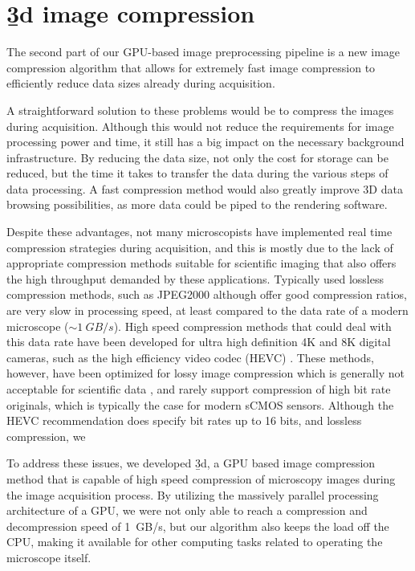 \section{\b3d image compression}

  The second part of our GPU-based image preprocessing pipeline is a new image compression algorithm that allows for extremely fast image compression to efficiently reduce data sizes already during acquisition.
  
  

  A straightforward solution to these problems would be to compress the images during acquisition. Although this would not reduce the requirements for image processing power and time, it still has a big impact on the necessary background infrastructure. By reducing the data size, not only the cost for storage can be reduced, but the time it takes to transfer the data during the various steps of data processing. A fast compression method would also greatly improve 3D data browsing possibilities, as more data could be piped to the rendering software.

  Despite these advantages, not many microscopists have implemented real time compression strategies during acquisition, and this is mostly due to the lack of appropriate compression methods suitable for scientific imaging that also offers the high throughput demanded by these applications. Typically used lossless compression methods, such as JPEG2000 \cite{adams_jpeg-2000_2001} although offer good compression ratios, are very slow in processing speed, at least compared to the data rate of a modern microscope ($\sim \SI{1}{GB/s}$). High speed compression methods that could deal with this data rate have been developed for ultra high definition 4K and 8K digital cameras, such as the high efficiency video codec (HEVC) \cite{international_telecommunications_union_h.265_2016}. These methods, however, have been optimized for lossy image compression which is generally not acceptable for scientific data \cite{cromey_digital_2013}, and rarely support compression of high bit rate originals, which is typically the case for modern sCMOS sensors. Although the HEVC recommendation does specify bit rates up to 16 bits, and lossless compression, we

  To address these issues, we developed \b3d, a GPU based image compression method that is capable of high speed compression of microscopy images during the image acquisition process. By utilizing the massively parallel processing architecture of a GPU, we were not only able to reach a compression and decompression speed of \SI{1}{GB/s}, but our algorithm also keeps the load off the CPU, making it available for other computing tasks related to operating the microscope itself.

